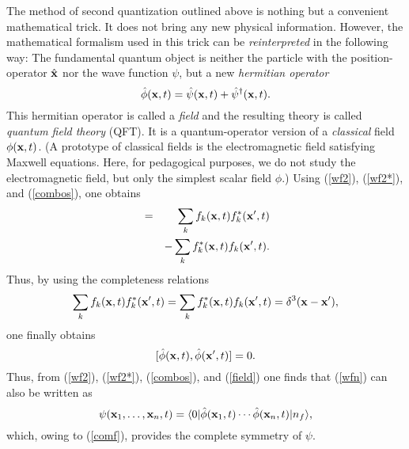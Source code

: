 \documentclass[12pt]{article}
\begin{document}
The method of second quantization outlined above 
is nothing but a convenient mathematical trick.
It does not bring any new physical information. However, 
the mathematical formalism used in this trick 
can be {\em reinterpreted} in the following way:
The fundamental quantum object is neither the particle 
with the position-operator $\hat{{\bf x}}$ nor the 
wave function $\psi$, but a new {\em hermitian operator}
\begin{equation}\label{field}
\hat{\phi}({\bf x},t) =
\hat{\psi}({\bf x},t) + \hat{\psi}^{\dagger}({\bf x},t) .
\end{equation}
This hermitian operator is called a {\em field} and 
the resulting theory is called {\em quantum field theory} (QFT).
It is a quantum-operator version of a {\em classical} field 
$\phi({\bf x},t)$. 
(A prototype of classical fields 
is the electromagnetic field satisfying Maxwell equations.
Here, for pedagogical purposes, we do not study the 
electromagnetic field, but only the simplest scalar field $\phi$.) 
Using (\ref{wf2}), (\ref{wf2*}), and (\ref{combos}), one obtains
\begin{eqnarray}
[\hat{\phi}({\bf x},t),\hat{\phi}({\bf x}',t)] & = &
\sum_k f_k({\bf x},t) f_k^*({\bf x}',t) \nonumber \\
& & -\sum_k f_k^*({\bf x},t) f_k({\bf x}',t) .
\end{eqnarray}
Thus, by
using the completeness relations
\begin{equation}
\sum_k f_k({\bf x},t) f_k^*({\bf x}',t)=
\sum_k f_k^*({\bf x},t) f_k({\bf x}',t)=\delta^3({\bf x}-{\bf x}') ,
\end{equation}
one finally obtains
\begin{equation}\label{comf}
[\hat{\phi}({\bf x},t),\hat{\phi}({\bf x}',t)]=0.
\end{equation}
Thus, from (\ref{wf2}), (\ref{wf2*}), (\ref{combos}), and (\ref{field}) one 
finds that (\ref{wfn}) can also be written as
\begin{equation}\label{wfn2}
\psi({\bf x}_1,\ldots,{\bf x}_n, t)=
\langle 0|\hat{\phi}({\bf x}_1,t)\cdots\hat{\phi}({\bf x}_n,t)|n_f\rangle ,
\end{equation}
which, owing to (\ref{comf}), provides the complete symmetry
of $\psi$. 
\end{document}
